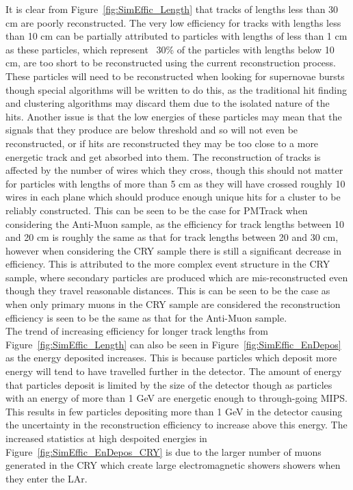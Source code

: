 It is clear from Figure~\ref{fig:SimEffic_Length} that tracks of lengths less than 30 cm are poorly reconstructed. The very low efficiency for tracks with lengths less than 10 cm can be partially attributed to particles with lengths of less than 1 cm as these particles, which represent ~30\% of the particles with lengths below 10 cm, are too short to be reconstructed using the current reconstruction process. These particles will need to be reconstructed when looking for supernovae bursts though special algorithms will be written to do this, as the traditional hit finding and clustering algorithms may discard them due to the isolated nature of the hits. Another issue is that the low energies of these particles may mean that the signals that they produce are below threshold and so will not even be reconstructed, or if hits are reconstructed they may be too close to a more energetic track and get absorbed into them. The reconstruction of tracks is affected by the number of wires which they cross, though this should not matter for particles with lengths of more than 5 cm as they will have crossed roughly 10 wires in each plane which should produce enough unique hits for a cluster to be reliably constructed. This can be seen to be the case for PMTrack when considering the Anti-Muon sample, as the efficiency for track lengths between 10 and 20 cm is roughly the same as that for track lengths between 20 and 30 cm, however when considering the CRY sample there is still a significant decrease in efficiency. This is attributed to the more complex event structure in the CRY sample, where secondary particles are produced which are mis-reconstructed even though they travel reasonable distances. This is can be seen to be the case as when only primary muons in the CRY sample are considered the reconstruction efficiency is seen to be the same as that for the Anti-Muon sample. \\

The trend of increasing efficiency for longer track lengths from Figure~\ref{fig:SimEffic_Length} can also be seen in Figure~\ref{fig:SimEffic_EnDepos} as the energy deposited increases. This is because particles which deposit more energy will tend to have travelled further in the detector. The amount of energy that particles deposit is limited by the size of the detector though as particles with an energy of more than 1 GeV are energetic enough to through-going MIPS. This results in few particles depositing more than 1 GeV in the detector causing the uncertainty in the reconstruction efficiency to increase above this energy. The increased statistics at high despoited energies in Figure~\ref{fig:SimEffic_EnDepos_CRY} is due to the larger number of muons generated in the CRY which create large electromagnetic showers showers when they enter the LAr. \\

